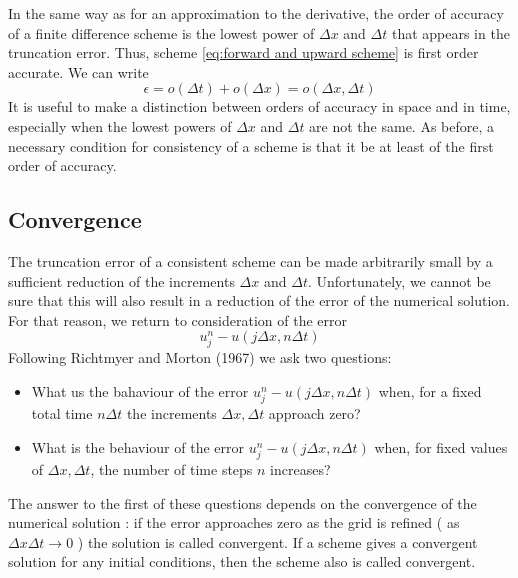In the same way as for an approximation to the deri­vative, the order of accuracy of a finite difference scheme is the lowest power of $\Delta x$ and $\Delta t$ that appears in the truncation error. Thus, scheme \ref{eq:forward and upward scheme} is first order accurate. We can write
$$\epsilon=o(\Delta t)+o(\Delta x)=o(\Delta x,\Delta t)$$
It is useful to make a distinction between orders of accuracy in space and in time, especially when the lowest powers of $\Delta x$ and $\Delta t$ are not the same. As before, a necessary condition for consistency of a scheme is that it be at least of the first order of accuracy. 
\subsection{Convergence}
The truncation error of a consistent scheme can be made arbitrarily small by a sufficient reduction of the increments $\Delta x$ and $\Delta t$. Unfortunately, we cannot be sure that this will also result in a reduction of the error of the numerical solution. For that reason, we return to consideration of the error 
$$u_j^n-u(j\Delta x,n\Delta t)$$
Following Richtmyer and Morton (1967) we ask two questions:
\begin{itemize}
    \item What us the bahaviour of the error $u_j^n-u(j\Delta x, n\Delta t)$ when, for a fixed total time $n\Delta t$ the increments $\Delta x, \Delta t$ approach zero?
    \item What is the behaviour of the error $u_j^n-u(j\Delta x, n\Delta t)$ when, for fixed values of $\Delta x, \Delta t$, the number of time steps $n$ increases?
\end{itemize}
 
 The answer to the first of these questions depends on the convergence of the numerical solution : if the error approaches zero as the grid is refined ( as $\Delta x\Delta t\rightarrow 0$ ) the solution is called convergent. If a scheme gives a convergent solution for any initial conditions, then the scheme also is called convergent.

